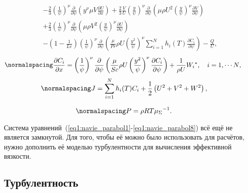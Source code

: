 \begin{equation}
\begin{split}
&-\frac{2}{3}\left(\frac{1}{\psi}\right)^\nu \frac{\partial}{\partial \psi}\left(y^\nu \mu V \frac{\partial U}{\partial x}\right)+\frac{2}{3} \frac{V}{U}\left(\frac{y}{\psi}\right)^\nu \frac{\partial}{\partial \psi}\left(\mu \rho U^{2}\left(\frac{y}{\psi}\right)^\nu \frac{\partial V}{\partial \psi}\right) \\
&+\frac{2}{3}\left(\frac{1}{\psi}\right)^\nu \frac{\partial}{\partial \psi}\left(\mu \rho V^{2}\left(\frac{y}{\psi}\right)^\nu \frac{\partial U}{\partial \psi}\right) \\
&-\left(1-\frac{1}{L e}\right)\left(\frac{1}{\psi}\right)^\nu \frac{\partial}{\partial \psi}\left(\frac{\mu}{P r} \rho U\left(\frac{y^{2}}{\psi}\right)^\nu \sum_{i=1}^{N} h_{i}(T) \frac{\partial C_{i}}{\partial \psi}\right)-\frac{Q}{U},
\end{split}
\end{equation}
\begin{equation}
\label{eq1:navie_parabol6}
\normalspacing
\begin{split}
&\frac{\partial C_{i}}{\partial x}=\left(\frac{1}{\psi}\right)^\nu \frac{\partial}{\partial \psi}\left(\frac{\mu}{S c} \rho U\left(\frac{y^{2}}{\psi}\right)^\nu \frac{\partial C_{i}}{\partial \psi}\right)+\frac{1}{\rho U} W_{i}{ }^{*}, \quad i=1, \cdots N \text {, }
\end{split}
\end{equation}
\begin{equation}
\label{eq1:navie_parabol7}
\normalspacing
\begin{split}
&J=\sum_{i=1}^{N} h_{i}(T) C_{i}+\frac{1}{2}\left(U^{2}+V^{2}+W^{2}\right),
\end{split}
\end{equation}

\begin{equation}
\label{eq1:navie_parabol8}
\normalspacing
\begin{split}
&P=\rho R T \mu_{\Sigma}{ }^{-1}.
\end{split}
\end{equation}

Система уравнений~(\ref{eq1:navie_parabol1}-\ref{eq1:navie_parabol8}) всё ещё не является замкнутой. Для того, чтобы её можно было использовать для расчётов, нужно дополнить её моделью турбулентности для вычисления эффективной вязкости. 

\subsection{Турбулентность}

